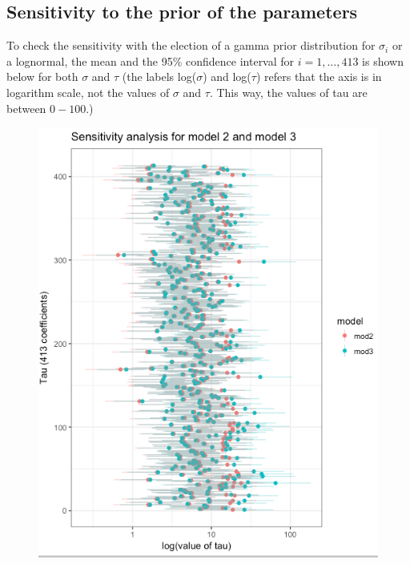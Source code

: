 \documentclass{article}
\begin{document}
\newpage
\subsection*{Sensitivity to the prior of the parameters}
To check the sensitivity with the election of a gamma prior distribution for $\sigma_i$ or a lognormal, the mean and the 95\% confidence interval for $i = 1, ..., 413$ is shown below for both $\sigma$ and $\tau$ (the labels log($\sigma$) and log($\tau$) refers that the axis is in logarithm scale, not the values of $\sigma$ and $\tau$. This way, the values of tau are between $0-100$.)

\begin{figure}[ht!]
\centering
\includegraphics[width=15cm]{figures/model3_sensitivity.png}
\end{figure}
\end{document}

